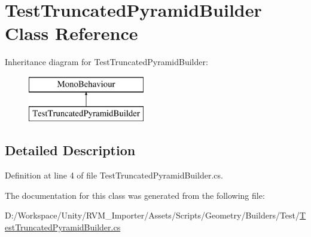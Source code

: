 \hypertarget{class_test_truncated_pyramid_builder}{}\section{Test\+Truncated\+Pyramid\+Builder Class Reference}
\label{class_test_truncated_pyramid_builder}
Inheritance diagram for Test\+Truncated\+Pyramid\+Builder\+:\begin{figure}[H]
\begin{center}
\leavevmode
\includegraphics[height=2.000000cm]{class_test_truncated_pyramid_builder}
\end{center}
\end{figure}


\subsection{Detailed Description}


Definition at line 4 of file Test\+Truncated\+Pyramid\+Builder.\+cs.



The documentation for this class was generated from the following file\+:\begin{DoxyCompactItemize}
\item 
D\+:/\+Workspace/\+Unity/\+R\+V\+M\+\_\+\+Importer/\+Assets/\+Scripts/\+Geometry/\+Builders/\+Test/\mbox{\hyperlink{_test_truncated_pyramid_builder_8cs}{Test\+Truncated\+Pyramid\+Builder.\+cs}}\end{DoxyCompactItemize}
